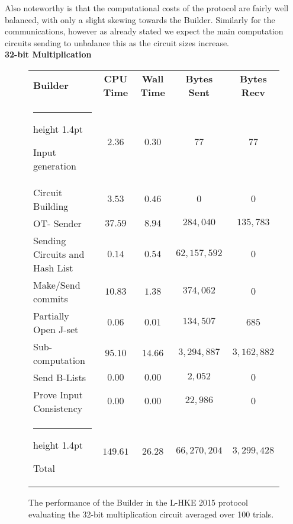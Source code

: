 \documentclass[11pt]{article} %
\makeatletter
\newcommand{\thickhline}{%
    \noalign {\ifnum 0=`}\fi \hrule height 1.4pt
    \futurelet \reserved@a \@xhline
}
\makeatother
\begin{document}
				Also noteworthy is that the computational costs of the protocol are fairly well balanced, with only a slight skewing towards the Builder. Similarly for the communications, however as already stated we expect the main computation circuits sending to unbalance this as the circuit sizes increase.\\

				\pagebreak
				\FloatBarrier
				\noindent \textbf{32-bit Multiplication}
				\begin{figure}[!ht]
					\begin{tabular}{| p{4.3cm} | c c c c |}
						\hline
						\textbf{Builder} & \textbf{CPU Time} & \textbf{Wall Time} & \textbf{Bytes Sent} & \textbf{Bytes Recv} \\
						\thickhline
						Input generation & $2.36$ & $0.30$ & $77$ & $77$ \\
						\hline
						Circuit Building & $3.53$ & $0.46$ & $0$ & $0$ \\
						\hline
						OT- Sender & $37.59$ & $8.94$ & $284,040$ & $135,783$ \\
						\hline
						Sending Circuits and Hash List & $0.14$ & $0.54$ & $62,157,592$ & $0$ \\
						\hline
						Make/Send commits & $10.83$ & $1.38$ & $374,062$ & $0$ \\
						\hline
						Partially Open J-set & $0.06$ & $0.01$ & $134,507$ & $685$ \\
						\hline
						Sub-computation & $95.10$ & $14.66$ & $3,294,887$ & $3,162,882$\\
						\hline
						Send B-Lists & $0.00$ & $0.00$ & $2,052$ & $0$ \\
						\hline
						Prove Input Consistency & $0.00$ & $0.00$ & $22,986$ & $0$ \\
						\thickhline
						Total & $149.61$ & $26.28$ & $66,270,204$ & $3,299,428$ \\
						\hline
					\end{tabular}
					\caption{The performance of the Builder in the L-HKE 2015 protocol evaluating the 32-bit multiplication circuit averaged over 100 trials. \label{table:L-HKE_2015_Mul_Builder}}
				\end{figure}
\end{document}
